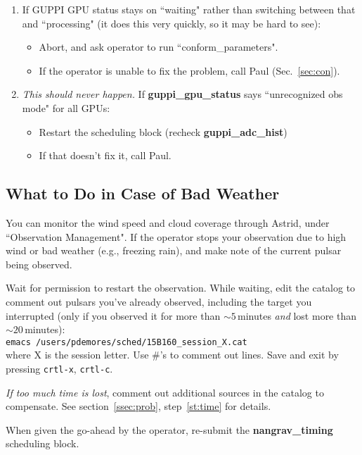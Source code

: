 \documentclass[11pt, reqno, tbtags]{article}
\begin{document}
\begin{enumerate}
 \item If GUPPI GPU status stays on ``waiting" rather than switching between that and ``processing" (it does this very quickly, so it may be hard to see): \begin{itemize}
  \item Abort, and ask operator to run ``conform\_parameters". 
  \item If the operator is unable to fix the problem, call Paul (Sec.~\ref{sec:con}). 
 \end{itemize}

 \item \textit{This should never happen.} If \textbf{guppi\_gpu\_status} says ``unrecognized obs mode" for all GPUs: \begin{itemize}
  \item Restart the scheduling block (recheck \textbf{guppi\_adc\_hist})
  \item If that doesn't fix it, call Paul.  \end{itemize}
\end{enumerate}

\subsection{What to Do in Case of Bad Weather}\label{ssec:weath}  %
You can monitor the wind speed and cloud coverage through Astrid, under ``Observation Management".  If the operator stops your observation due to high wind or bad weather (e.g., freezing rain), and make note of the current pulsar being observed. 

\noindent Wait for permission to restart the observation.  While waiting, edit the catalog to comment out pulsars you've already observed, including the target you interrupted (only if you observed it for more than $\sim5$\,minutes \textit{and} lost more than $\sim20$\,minutes): \\
\indent\texttt{emacs /users/pdemores/sched/15B160\_session\_X.cat} \\
where X is the session letter.  Use \#'s to comment out lines.  Save and exit by pressing \texttt{crtl-x}, \texttt{crtl-c}.  

\noindent\textit{If too much time is lost}, comment out additional sources in the catalog to compensate.  See section~\ref{ssec:prob}, step~\ref{st:time} for details. 

\noindent When given the go-ahead by the operator, re-submit the \textbf{nangrav\_timing} scheduling block. 
\end{document}
